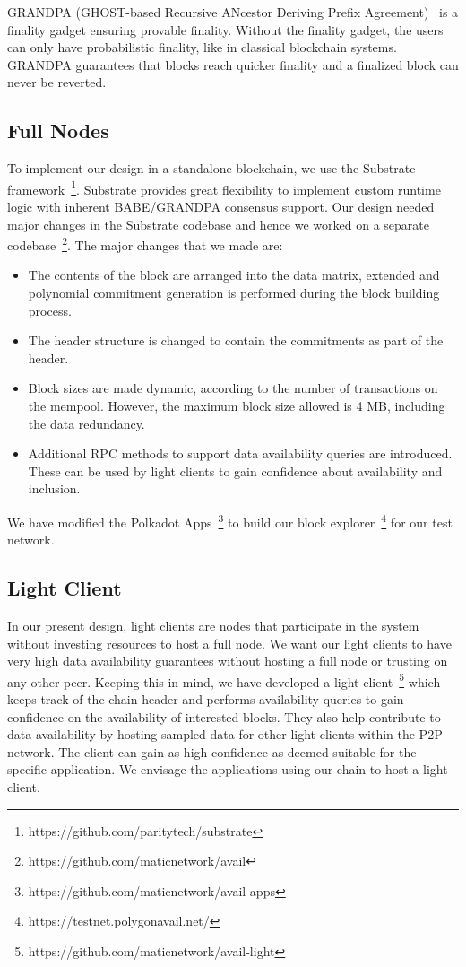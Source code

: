 \documentclass[sigconf, screen=true, nonacm]{acmart}
\begin{document}
        GRANDPA (GHOST-based Recursive ANcestor Deriving Prefix Agreement)~\cite{grandpa} is a finality gadget ensuring provable finality. Without the finality gadget, the users can only have probabilistic finality, like in classical blockchain systems. GRANDPA guarantees that blocks reach quicker finality and a finalized block can never be reverted. 

    \subsection{Full Nodes}
        To implement our design in a standalone blockchain, we use the Substrate framework~\footnote{https://github.com/paritytech/substrate}. Substrate provides great flexibility to implement custom runtime logic with inherent BABE/GRANDPA consensus support. Our design needed major changes in the Substrate codebase and hence we worked on a separate codebase~\footnote{https://github.com/maticnetwork/avail}. The major changes that we made are:
        \begin{itemize}
            \item The contents of the block are arranged into the data matrix, extended and polynomial commitment generation is performed during the block building process. 
            \item The header structure is changed to contain the commitments as part of the header. 
            \item Block sizes are made dynamic, according to the number of transactions on the mempool. However, the maximum block size allowed is 4 MB, including the data redundancy.  
            \item Additional RPC methods to support data availability queries are introduced. These can be used by light clients to gain confidence about availability and inclusion.
        \end{itemize}
        We have modified the Polkadot Apps~\footnote{https://github.com/maticnetwork/avail-apps} to build our block explorer~\footnote{https://testnet.polygonavail.net/} for our test network. 

    \subsection{Light Client}
        In our present design, light clients are nodes that participate in the system without investing resources to host a full node. We want our light clients to have very high data availability guarantees without hosting a full node or trusting on any other peer. Keeping this in mind, we have developed a light client~\footnote{https://github.com/maticnetwork/avail-light} which keeps track of the chain header and performs availability queries to gain confidence on the availability of interested blocks. They also help contribute to data availability by hosting sampled data for other light clients within the P2P network. The client can gain as high confidence as deemed suitable for the specific application. We envisage the applications using our chain to host a light client.
\end{document}
